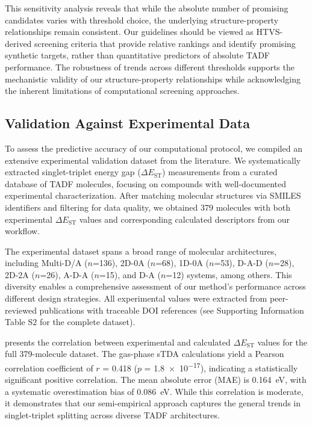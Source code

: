 \documentclass[journal=jcisd8,manuscript=article,keywords=true]{achemso}
\begin{document}
This sensitivity analysis reveals that while the absolute number of promising candidates varies with threshold choice, the underlying structure-property 
relationships remain consistent. Our guidelines should be viewed as HTVS-derived screening criteria that provide relative rankings and identify promising 
synthetic targets, rather than quantitative predictors of absolute TADF performance. The robustness of trends across different thresholds supports the 
mechanistic validity of our structure-property relationships while acknowledging the inherent limitations of computational screening approaches.

\subsection{Validation Against Experimental Data}\label{sec:validation}

To assess the predictive accuracy of our computational protocol, we compiled an extensive experimental validation dataset from the literature. We systematically extracted singlet-triplet energy gap ($\Delta E_{\mathrm{ST}}$) measurements from a curated database of TADF molecules,\cite{Huang_2024} focusing on compounds with well-documented experimental characterization. After matching molecular structures via SMILES identifiers and filtering for data quality, we obtained \num{379} molecules with both experimental $\Delta E_{\mathrm{ST}}$ values and corresponding calculated descriptors from our workflow.

The experimental dataset spans a broad range of molecular architectures, including Multi-D/A ($n$=136), 2D-0A ($n$=68), 1D-0A ($n$=53), D-A-D ($n$=28), 2D-2A ($n$=26), A-D-A ($n$=15), and D-A ($n$=12) systems, among others. This diversity enables a comprehensive assessment of our method's performance across different design strategies. All experimental values were extracted from peer-reviewed publications with traceable DOI references (see Supporting Information Table S2 for the complete dataset).

 presents the correlation between experimental and calculated $\Delta E_{\mathrm{ST}}$ values for the full \num{379}-molecule dataset. The gas-phase sTDA calculations yield a Pearson correlation coefficient of $r$ = \num{0.418} ($p$ = \num{1.8e-17}), indicating a statistically significant positive correlation. The mean absolute error (MAE) is \qty{0.164}{\electronvolt}, with a systematic overestimation bias of \qty{+0.086}{\electronvolt}. While this correlation is moderate, it demonstrates that our semi-empirical approach captures the general trends in singlet-triplet splitting across diverse TADF architectures.
\end{document}

